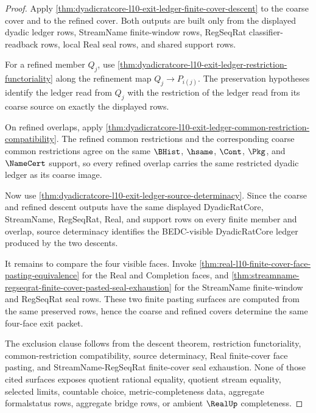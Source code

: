 \begin{proof}
Apply \autoref{thm:dyadicratcore-l10-exit-ledger-finite-cover-descent} to the coarse cover and to the refined cover. Both outputs are built only from the displayed dyadic ledger rows, StreamName finite-window rows, RegSeqRat classifier-readback rows, local Real seal rows, and shared support rows.

For a refined member $Q_j$, use \autoref{thm:dyadicratcore-l10-exit-ledger-restriction-functoriality} along the refinement map $Q_j \to P_{i(j)}$. The preservation hypotheses identify the ledger read from $Q_j$ with the restriction of the ledger read from its coarse source on exactly the displayed rows.

On refined overlaps, apply \autoref{thm:dyadicratcore-l10-exit-ledger-common-restriction-compatibility}. The refined common restrictions and the corresponding coarse common restrictions agree on the same $\BHist$, $\hsame$, $\Cont$, $\Pkg$, and $\NameCert$ support, so every refined overlap carries the same restricted dyadic ledger as its coarse image.

Now use \autoref{thm:dyadicratcore-l10-exit-ledger-source-determinacy}. Since the coarse and refined descent outputs have the same displayed DyadicRatCore, StreamName, RegSeqRat, Real, and support rows on every finite member and overlap, source determinacy identifies the BEDC-visible DyadicRatCore ledger produced by the two descents.

It remains to compare the four visible faces. Invoke \autoref{thm:real-l10-finite-cover-face-pasting-equivalence} for the Real and Completion faces, and \autoref{thm:streamname-regseqrat-finite-cover-pasted-seal-exhaustion} for the StreamName finite-window and RegSeqRat seal rows. These two finite pasting surfaces are computed from the same preserved rows, hence the coarse and refined covers determine the same four-face exit packet.

The exclusion clause follows from the descent theorem, restriction functoriality, common-restriction compatibility, source determinacy, Real finite-cover face pasting, and StreamName-RegSeqRat finite-cover seal exhaustion. None of those cited surfaces exposes quotient rational equality, quotient stream equality, selected limits, countable choice, metric-completeness data, aggregate formalstatus rows, aggregate bridge rows, or ambient $\RealUp$ completeness.
\end{proof}

